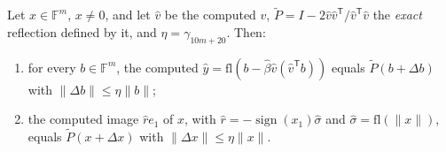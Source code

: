 \begin{lemma}\label{lem:onereflection}
Let $x\in\mathbb F^m$, $x\ne0$, and let $\hat v$ be the computed $v$, $\tilde P=I-2\hat v\hat v^{\mathsf T}/\hat v^{\mathsf T}\hat v$ the \emph{exact} reflection
defined by it, and $\eta=\gamma_{10m+20}$. Then:
\begin{enumerate}
\item for every $b\in\mathbb F^m$, the computed $\hat y=\mathrm{fl}(b-\hat\beta\hat v(\hat v^{\mathsf T}b))$ equals $\tilde P(b+\Delta b)$ with $\|\Delta b\|\le\eta\|b\|$;
\item the computed image $\hat r e_1$ of $x$, with $\hat r=-\operatorname{sign}(x_1)\hat\sigma$ and $\hat\sigma=\mathrm{fl}(\|x\|)$, equals
$\tilde P(x+\Delta x)$ with $\|\Delta x\|\le\eta\|x\|$.
\end{enumerate}
\end{lemma}
